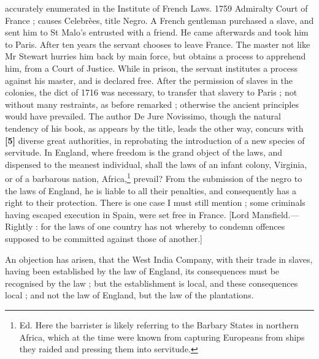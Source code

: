 \documentclass[a4paper]{article}
\begin{document}
accurately enumerated in the Institute of French Laws. 1759 Admiralty Court of France ; causes Celebr\`ees, title Negro. A French gentleman purchased a slave, and sent him to St Malo's entrusted with a friend. He came afterwards and took him to Paris. After ten years the servant chooses to leave France. The master not like Mr Stewart hurries him back by main force, but obtains a process to apprehend him, from a Court of Justice. While in prison, the servant institutes a process against his master, and is declared free. After the permission of slaves in the colonies, the dict of 1716 was necessary, to transfer that slavery to Paris ; not without many restraints, as before remarked ; otherwise the ancient principles would have prevailed. The author De Jure Novissimo, though the natural tendency of his book, as appears by the title, leads the other way, concurs with \textbf{[5]} diverse great authorities, in reprobating the introduction of a new species of servitude. In England, where freedom is the grand object of the laws, and dispensed to the meanest individual, shall the laws of an infant colony, Virginia, or of a barbarous nation, Africa,\footnote{Ed. Here the barrister is likely referring to the Barbary States in northern Africa, which at the time were known from capturing Europeans from ships they raided and pressing them into servitude.} prevail? From the submission of the negro to the laws of England, he is liable to all their penalties, and consequently has a right to their protection. There is one case I must still mention ; some criminals having escaped execution in Spain, were set free in France. [Lord Mansfield.---Rightly : for the laws of one country has not whereby to condemn offences supposed to be committed against those of another.]

An objection has arisen, that the West India Company, with their trade in slaves, having been established by the law of England, its consequences must be recognised by the law ; but the establishment is local, and these consequences local ; and not the law of England, but the law of the plantations.
\end{document}
